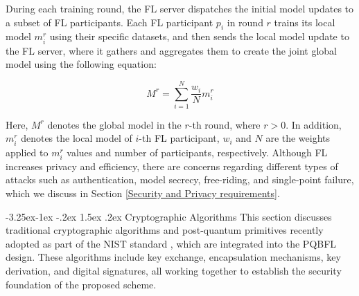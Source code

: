 \documentclass[a4paper,fleqn]{cas-dc}
\makeatletter
\renewcommand\subsection{\@startsection{subsection}{2}{\z@}%
   {-3.25ex\@plus -1ex \@minus -.2ex}%
   {1.5ex \@plus .2ex}%
   {\normalfont\large}} %
\makeatother
\begin{document}
During each training round, the FL server dispatches the initial model updates to a subset of FL participants.
Each FL participant $p_{i}$ in round $r$ trains its local model $m_{i}^{r}$ using their specific datasets, and then sends the local model update to the FL server, where it gathers and aggregates them to create the joint global model using the following equation:

\begin{equation}
    M^{r}=\sum_{i=1}^{N} \frac{{w_{i}}}{N} m_{i}^{r}
\end{equation}

Here, $M^{r}$ denotes the global model in the $r$-th round, where $r>0$. 
In addition, $m_{i}^{r}$ denotes the local model of $i$-th FL participant, $w_{i}$ and $N$ are the weights applied to $m_{i}^{r}$ values and number of participants, respectively.
Although FL increases privacy and efficiency, there are concerns regarding different types of attacks such as authentication, model secrecy, free-riding, and single-point failure, which we discuss in Section \ref{Security and Privacy requirements}.


\subsection{Cryptographic Algorithms}
\label{Cryptographic Algorithms}
This section discusses traditional cryptographic algorithms and post-quantum primitives recently adopted as part of the NIST standard \citep{standard_kyber}, which are integrated into the PQBFL design. 
These algorithms include key exchange, encapsulation mechanisms, key derivation, and digital signatures, all working together to establish the security foundation of the proposed scheme. 
\end{document}
